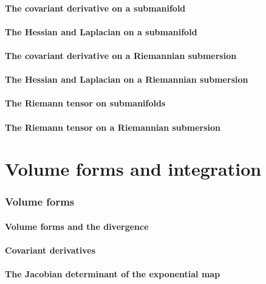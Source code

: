 \documentclass[a4paper]{article}
\begin{document}
\subsection{The covariant derivative on a submanifold}

\subsection{The Hessian and Laplacian on a submanifold}

\subsection{The covariant derivative on a Riemannian submersion}

\subsection{The Hessian and Laplacian on a Riemannian submersion}

\subsection{The Riemann tensor on submanifolds}

\subsection{The Riemann tensor on a Riemannian submersion}

\part{Volume forms and integration}

\section{Volume forms}

\subsection{Volume forms and the divergence}

\subsection{Covariant derivatives}

\subsection{The Jacobian determinant of the exponential map}
\end{document}
